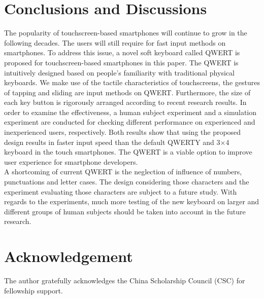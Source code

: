 \documentclass{singlecol-new}
\theoremstyle{TH}{
\newtheorem{lemma}{Lemma}
\newtheorem{theorem}[lemma]{Theorem}
\newtheorem{corrolary}[lemma]{Corrolary}
\newtheorem{conjecture}[lemma]{Conjecture}
\newtheorem{proposition}[lemma]{Proposition}
\newtheorem{claim}[lemma]{Claim}
\newtheorem{stheorem}[lemma]{Wrong Theorem}
\newtheorem{algorithm}{Algorithm}
}
\theoremstyle{THrm}{
\newtheorem{definition}{Definition}[section]
\newtheorem{question}{Question}[section]
\newtheorem{remark}{Remark}
\newtheorem{scheme}{Scheme}
}
\theoremstyle{THhit}{
\newtheorem{case}{Case}[section]
}
\begin{document}
\section{Conclusions and Discussions}

	The popularity of touchscreen-based smartphones will continue to grow in the following decades. The users will still require for fast input methods on smartphones. To address this issue, a novel soft keyboard called QWERT is proposed for touchscreen-based smartphones in this paper. The QWERT is intuitively designed based on people's familiarity with traditional physical keyboards. We make use of the tactile characteristics of touchscreens, the gestures of tapping and sliding are input methods on QWERT. Furthermore, the size of each key button is rigorously arranged according to recent research results. In order to examine the effectiveness, a human subject experiment and a simulation experiment are conducted for checking different performance on experienced and inexperienced users, respectively. Both results show that using the proposed design results in faster input speed than the default QWERTY and 3$\times$4 keyboard in the touch smartphones. The QWERT is a viable option to improve user experience for smartphone developers. \\

A shortcoming of current QWERT is the neglection of influence of numbers, punctuations and letter cases. The design considering those characters and the experiment evaluating those characters are subject to a future study. With regards to the experiments, much more testing of the new keyboard on larger and different groups of human subjects should be taken into account in the future research.


\section*{Acknowledgement}
The author gratefully acknowledges the China Scholarship Council (CSC) for fellowship support.





\end{document}
